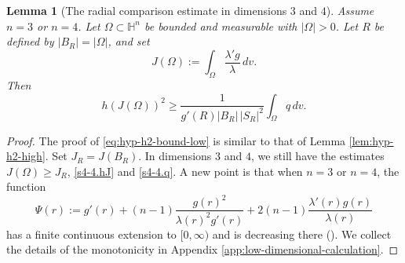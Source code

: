 \documentclass[11pt,reqno]{amsart}
\numberwithin{equation}{section}
\newtheorem{lemma}[theorem]{Lemma}
\theoremstyle{definition}
\newcommand{\HH}{\mathbb H}
\begin{document}
\begin{lemma}[The radial comparison estimate in dimensions $3$ and $4$]\label{prop:hyp-h2-low}
Assume $n=3$ or $n=4$.  Let $\Omega\subset\HH^n$ be bounded and measurable with $|\Omega|>0$.  Let $R$ be defined by $|B_R|=|\Omega|$, and set
\begin{equation*}
    J(\Omega):=\int_\Omega \frac{\lambda'g}{\lambda}\,dv.
\end{equation*}
Then
\begin{equation}\label{eq:hyp-h2-bound-low}
    h(J(\Omega))^2
    \geq
    \frac{1}{g'(R)|B_R|\,|S_R|^2}
    \int_\Omega q\,dv.
\end{equation}
\end{lemma}

\begin{proof}
The proof of \eqref{eq:hyp-h2-bound-low} is similar to that of Lemma \ref{lem:hyp-h2-high}. Set $J_R=J(B_R)$. In dimensions $3$ and $4$, we still have the estimates $J(\Omega)\geq J_R$, \eqref{s4-4.hJ} and \eqref{s4-4.q}. A new point is that when $n=3$ or $n=4$, the function 
\begin{equation}\label{eq:hyp-Psi-def}
    \Psi(r):=g'(r)+(n-1)\frac{g(r)^2}{\lambda(r)^2g'(r)}
       +2(n-1)\frac{\lambda'(r)g(r)}{\lambda(r)}
\end{equation}
has a finite continuous extension to $[0,\infty)$ and is decreasing there (\cite[Section~4.3.2]{GuThesis2026}). We collect the details of the monotonicity in Appendix \ref{app:low-dimensional-calculation}. 


\end{proof}
\end{document}
